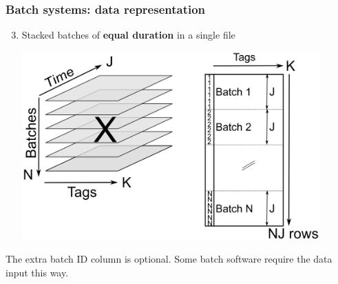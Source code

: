 \begin{frame}\frametitle{Batch systems: data representation}

\begin{enumerate}
	\setcounter{enumi}{2}
	\item	Stacked batches of \textbf{equal duration} in a single file

			\begin{center}
				\includegraphics[width=0.9\textwidth]{images/batch-data-layers-into-page-and-unfolded-aligned}
			\end{center}
					
\end{enumerate}
The extra batch ID column is optional.  Some batch software require the data input this way.
\end{frame}

